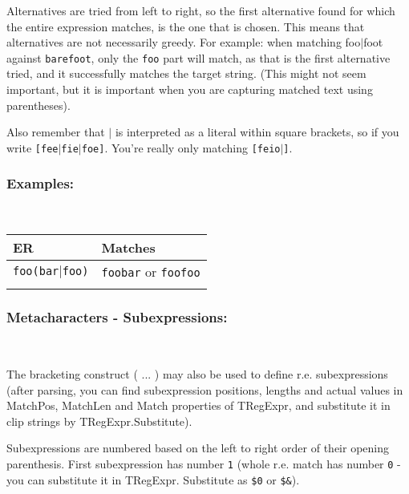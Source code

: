 Alternatives are tried from left to right, so the first alternative found
for which the entire expression matches, is the one that is chosen. This
means that alternatives are not necessarily greedy. For example: when
matching foo$|$foot against \texttt{barefoot}, only the \texttt{foo} part
will match, as that is the first alternative tried, and it successfully
matches the target string. (This might not seem important, but it is
important when you are capturing matched text using parentheses).

Also remember that \texttt{$|$} is interpreted as a literal within square
brackets, so if you write \texttt{[fee$|$fie$|$foe]}. You're really only
matching \texttt{[feio$|$]}.


\subsubsection{Examples:}\\

\begin{footnotesize}
  \begin{tabularx}{\textwidth}{>{\hsize=0.3\hsize}X>{\hsize=0.7\hsize}X}\\
    \hline
    \textbf{ER} & \textbf{Matches} \\
    \hline
    \texttt{foo(bar$|$foo)} & \texttt{foobar} or \texttt{foofoo} \\
    \hline
    \\
  \end{tabularx}
\end{footnotesize}


\subsubsection{Metacharacters - Subexpressions:}\\

The bracketing construct ( ... ) may also be used to define r.e.
subexpressions (after parsing, you can find subexpression positions,
lengths and actual values in MatchPos, MatchLen and Match properties
of TRegExpr, and substitute it in clip strings by TRegExpr.Substitute).

Subexpressions are numbered based on the left to right order of their
opening parenthesis. First subexpression has number \texttt{1} (whole
r.e. match has number \texttt{0} - you can substitute it in TRegExpr.
Substitute as \texttt{\$0} or \texttt{\$\&}).


